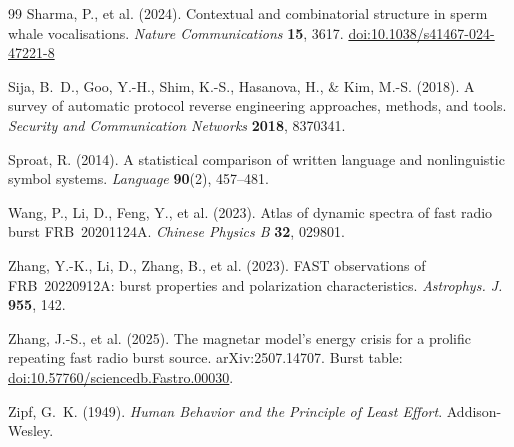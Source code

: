 \documentclass[11pt,a4paper]{article}
\providecommand{\doi}[1]{\href{https://doi.org/#1}{doi:#1}}
\begin{document}
\begin{thebibliography}{99}
 Sharma, P., et al. (2024). Contextual and combinatorial structure
in sperm whale vocalisations. \emph{Nature Communications} \textbf{15}, 3617.
\doi{10.1038/s41467-024-47221-8}

 Sija, B.~D., Goo, Y.-H., Shim, K.-S., Hasanova, H., \& Kim, M.-S.
(2018). A survey of automatic protocol reverse engineering approaches, methods, and
tools. \emph{Security and Communication Networks} \textbf{2018}, 8370341.

 Sproat, R. (2014). A statistical comparison of written language and
nonlinguistic symbol systems. \emph{Language} \textbf{90}(2), 457--481.

 Wang, P., Li, D., Feng, Y., et al. (2023). Atlas of dynamic spectra
of fast radio burst FRB~20201124A. \emph{Chinese Physics B} \textbf{32}, 029801.

 Zhang, Y.-K., Li, D., Zhang, B., et al. (2023). FAST observations
of FRB~20220912A: burst properties and polarization characteristics.
\emph{Astrophys. J.} \textbf{955}, 142.

 Zhang, J.-S., et al. (2025). The magnetar model's energy crisis
for a prolific repeating fast radio burst source. arXiv:2507.14707. Burst table:
\doi{10.57760/sciencedb.Fastro.00030}.

 Zipf, G.~K. (1949). \emph{Human Behavior and the Principle of Least
Effort}. Addison-Wesley.

\end{thebibliography}
\end{document}
